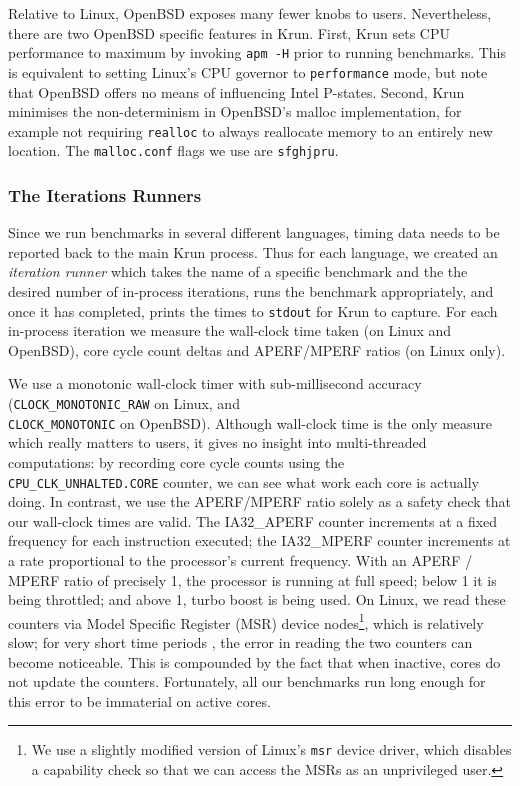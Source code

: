 \documentclass[preprint,numbers,10pt]{sigplanconf}
\newcommand{\krun}{Krun\xspace}
\begin{document}
Relative to Linux, OpenBSD exposes many fewer knobs to users. Nevertheless,
there are two OpenBSD specific features in \krun.
First, \krun sets CPU performance to maximum by invoking \texttt{apm -H} prior
to running benchmarks. This is equivalent to setting Linux's CPU governor to
\texttt{performance} mode, but note that OpenBSD offers no means of influencing
Intel P-states.
Second, \krun minimises the non-determinism in OpenBSD's malloc implementation,
for example not requiring \texttt{realloc} to always reallocate memory to
an entirely new location. The \texttt{malloc.conf} flags we use are \texttt{sfghjpru}.


\subsubsection{The Iterations Runners}

Since we run benchmarks in several different languages, timing data needs
to be reported back to the main \krun process. Thus for each language, we created an
\emph{iteration runner} which takes the name of a specific benchmark and the
the desired number of in-process iterations, runs the benchmark appropriately,
and once it has completed, prints the times to \texttt{stdout} for \krun to
capture. For each in-process iteration we
measure the wall-clock time taken (on Linux and OpenBSD), core
cycle count deltas and APERF/MPERF ratios (on Linux only).

We use a monotonic wall-clock timer with sub-millisecond accuracy
(\texttt{CLOCK\_MONOTONIC\_RAW} on Linux, and \\\texttt{CLOCK\_MONOTONIC} on
OpenBSD). Although wall-clock time is the only measure which really matters to
users, it gives no insight into multi-threaded computations: by recording
core cycle counts using the \\\texttt{CPU\_CLK\_UNHALTED.CORE} counter, we can see
what work each core is actually doing. In contrast, we use the APERF/MPERF
ratio solely as a safety check that our wall-clock times are valid.
The IA32\_APERF counter increments at a fixed
frequency for each instruction executed; the IA32\_MPERF counter increments at a rate
proportional to the processor's current frequency. With an APERF / MPERF ratio of
precisely 1, the processor is running at full speed; below 1 it is being
throttled; and above 1, turbo boost is being used. On
Linux, we read these counters via Model Specific Register (MSR) device
nodes\footnote{We use a slightly modified version of Linux's \texttt{msr} device
driver, which disables a capability check so that we can access the MSRs as an
unprivileged user.}, which is relatively
slow; for very short time periods , the error in reading the two counters can become
noticeable. This is compounded by the fact that when inactive, cores do not
update the counters. Fortunately, all our benchmarks run long enough for this
error to be immaterial on active cores.
\end{document}
